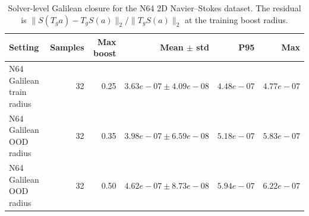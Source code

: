 \begin{table}[t]
\centering
\small
\caption{Solver-level Galilean closure for the N64 2D Navier--Stokes dataset. The residual is $\|S(T_g a)-T_gS(a)\|_2/\|T_gS(a)\|_2$ at the training boost radius.}
\label{tab:n64-solver-closure}
\begin{tabular}{lrrrrr}
\toprule
Setting & Samples & Max boost & Mean $\pm$ std & P95 & Max \\
\midrule
N64 Galilean train radius & 32 & 0.25 & \(3.63e-07\pm4.09e-08\) & \(4.48e-07\) & \(4.77e-07\) \\
N64 Galilean OOD radius & 32 & 0.35 & \(3.98e-07\pm6.59e-08\) & \(5.18e-07\) & \(5.83e-07\) \\
N64 Galilean OOD radius & 32 & 0.50 & \(4.62e-07\pm8.73e-08\) & \(5.94e-07\) & \(6.22e-07\) \\
\bottomrule
\end{tabular}
\end{table}
